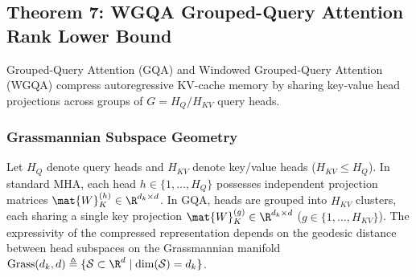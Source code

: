 \subsection{Theorem 7: WGQA Grouped-Query Attention Rank Lower Bound}
\label{sec:thm_wgqa_bound}

Grouped-Query Attention (GQA) \cite{ainslie2023gqa} and Windowed Grouped-Query Attention (WGQA) compress autoregressive KV-cache memory by sharing key-value head projections across groups of $G = H_Q / H_{KV}$ query heads.

\subsubsection{Grassmannian Subspace Geometry}
Let $H_Q$ denote query heads and $H_{KV}$ denote key/value heads ($H_{KV} \le H_Q$). In standard MHA, each head $h \in \{1, \dots, H_Q\}$ possesses independent projection matrices $\mat{W}_K^{(h)} \in \R^{d_k \times d}$. In GQA, heads are grouped into $H_{KV}$ clusters, each sharing a single key projection $\mat{W}_K^{(g)} \in \R^{d_k \times d}$ ($g \in \{1, \dots, H_{KV}\}$). The expressivity of the compressed representation depends on the geodesic distance between head subspaces on the Grassmannian manifold $\Grass(d_k, d) \triangleq \{ \mathcal{S} \subset \R^d \mid \dim(\mathcal{S}) = d_k \}$.

